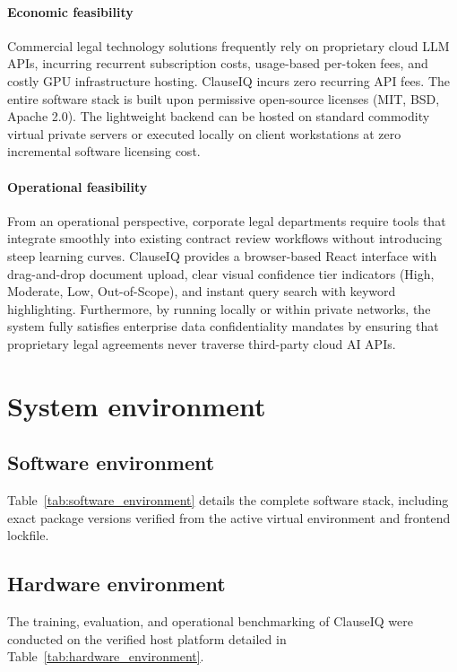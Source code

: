 \paragraph*{Economic feasibility}
Commercial legal technology solutions frequently rely on proprietary cloud LLM APIs, incurring recurrent subscription costs, usage-based per-token fees, and costly GPU infrastructure hosting. ClauseIQ incurs zero recurring API fees. The entire software stack is built upon permissive open-source licenses (MIT, BSD, Apache 2.0). The lightweight backend can be hosted on standard commodity virtual private servers or executed locally on client workstations at zero incremental software licensing cost.

\paragraph*{Operational feasibility}
From an operational perspective, corporate legal departments require tools that integrate smoothly into existing contract review workflows without introducing steep learning curves. ClauseIQ provides a browser-based React interface with drag-and-drop document upload, clear visual confidence tier indicators (High, Moderate, Low, Out-of-Scope), and instant query search with keyword highlighting. Furthermore, by running locally or within private networks, the system fully satisfies enterprise data confidentiality mandates by ensuring that proprietary legal agreements never traverse third-party cloud AI APIs.

\section{System environment}
\label{sec:system_environment}

\subsection{Software environment}
\label{subsec:software_env}

Table~\ref{tab:software_environment} details the complete software stack, including exact package versions verified from the active virtual environment and frontend lockfile.



\subsection{Hardware environment}
\label{subsec:hardware_env}

The training, evaluation, and operational benchmarking of ClauseIQ were conducted on the verified host platform detailed in Table~\ref{tab:hardware_environment}.


